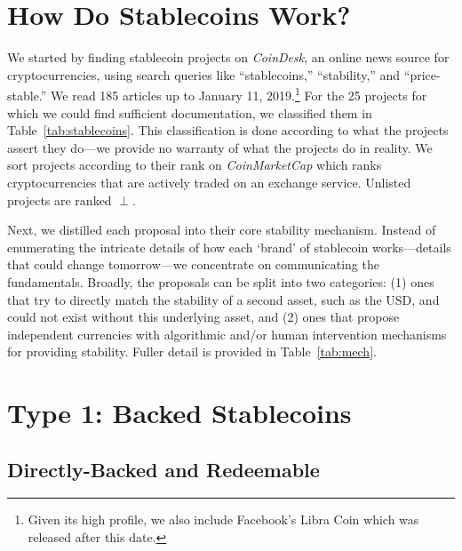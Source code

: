\section{How Do Stablecoins Work?}

We started by finding stablecoin projects on \textit{CoinDesk}, an online news source for cryptocurrencies, using search queries like ``stablecoins,'' ``stability,'' and ``price-stable.'' We read 185 articles up to January 11, 2019.\footnote{Given its high profile, we also include Facebook's Libra Coin which was released after this date.} For the 25 projects for which we could find sufficient documentation, we classified them in Table~\ref{tab:stablecoins}. This classification is done according to what the projects assert they do---we provide no warranty of what the projects do in reality. We sort projects according to their rank on \textit{CoinMarketCap} which ranks cryptocurrencies that are actively traded on an exchange service. Unlisted projects are ranked $\perp$.

Next, we distilled each proposal into their core stability mechanism. Instead of enumerating the intricate details of how each `brand' of stablecoin works---details that could change tomorrow---we concentrate on communicating the fundamentals. Broadly, the proposals can be split into two categories: (1) ones that try to directly match the stability of a second asset, such as the USD, and could not exist without this underlying asset, and (2) ones that propose independent currencies with algorithmic and/or human intervention mechanisms for providing stability. Fuller detail is provided in Table~\ref{tab:mech}.









\section{Type 1: Backed Stablecoins}
\label{sec:t1}

\subsection{Directly-Backed and Redeemable}
\label{sec:redeem}

